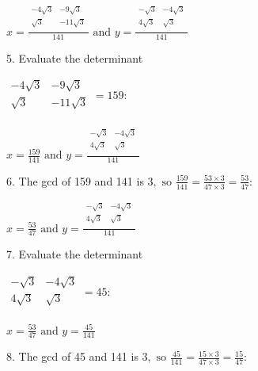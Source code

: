 \documentclass{article}
\begin{document}
$x=\frac{
            \begin{array}{|c|c|}
-4 \sqrt{3} & -9 \sqrt{3}  \\
                \sqrt{3}    & -11 \sqrt{3} \\
            \end{array}
        }{141}\text{ and }y=\frac{
            \begin{array}{|c|c|}
-\sqrt{3}  & -4 \sqrt{3} \\
                4 \sqrt{3} & \sqrt{3}    \\
            \end{array}
        }{141}$

5. Evaluate the determinant 

$\begin{array}{|c|c|}
-4 \sqrt{3} & -9 \sqrt{3}  \\
            \sqrt{3}    & -11 \sqrt{3} \\
        \end{array}
        =159:$

$x=\frac{159}{141}\text{ and }y=\frac{
            \begin{array}{|c|c|}
-\sqrt{3}  & -4 \sqrt{3} \\
                4 \sqrt{3} & \sqrt{3}    \\
            \end{array}
        }{141}$

6. The gcd of 159 and 141 is $3,\text{ so }\frac{159}{141}=\frac{53\times 3}{47\times 3}=\frac{53}{47}$:

$x=\frac{53}{47}\text{ and }y=\frac{
            \begin{array}{|c|c|}
-\sqrt{3}  & -4 \sqrt{3} \\
                4 \sqrt{3} & \sqrt{3}    \\
            \end{array}
        }{141}$

7. Evaluate the determinant 

$\begin{array}{|c|c|}
-\sqrt{3}  & -4 \sqrt{3} \\
            4 \sqrt{3} & \sqrt{3}    \\
        \end{array}
        =45:$

$x=\frac{53}{47}\text{ and }y=\frac{45}{141}$

8. The gcd of 45 and 141 is $3,\text{ so }\frac{45}{141}=\frac{15\times 3}{47\times 3}=\frac{15}{47}$:
\end{document}
